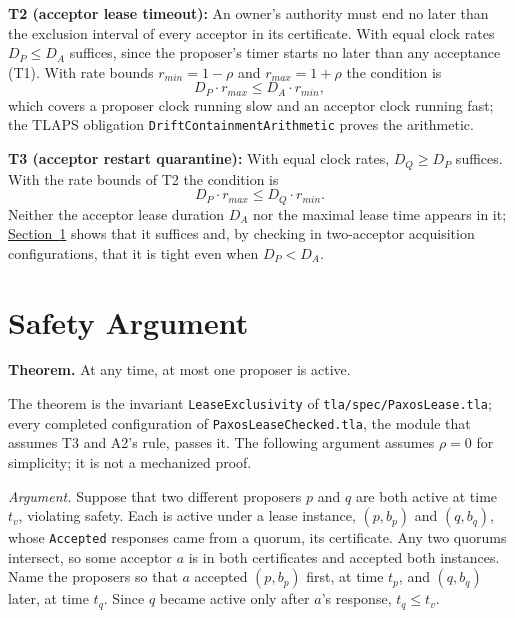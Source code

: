 \documentclass[final,5p,times,twocolumn,number]{elsarticle}
\newcommand{\code}[1]{\texttt{#1}}
\newcommand{\invitem}[1]{\smallskip\noindent\textbf{#1:} }
\newcommand{\secref}[1]{\hyperref[#1]{Section~\ref*{#1}}}
\begin{document}
\invitem{T2 (acceptor lease timeout)}An owner's authority must end no later than the exclusion interval of every acceptor in its certificate.  With equal clock rates $D_P \leq D_A$ suffices, since the proposer's timer starts no later than any acceptance (T1).  With rate bounds $r_{min} = 1-\rho$ and $r_{max} = 1+\rho$ the condition is
\[
  D_P \cdot r_{max} \leq D_A \cdot r_{min},
\]
which covers a proposer clock running slow and an acceptor clock running fast; the TLAPS obligation \code{DriftContainmentArithmetic} proves the arithmetic.

\invitem{T3 (acceptor restart quarantine)}With equal clock rates, $D_Q \geq D_P$ suffices.  With the rate bounds of T2 the condition is
\[
  D_P \cdot r_{max} \leq D_Q \cdot r_{min}.
\]
Neither the acceptor lease duration $D_A$ nor the maximal lease time appears in it; \secref{sec:safety} shows that it suffices and, by checking in two-acceptor acquisition configurations, that it is tight even when $D_P < D_A$.

\section{Safety Argument}\label{sec:safety}

\medskip
\noindent\textbf{Theorem.} At any time, at most one proposer is active.
\medskip

The theorem is the invariant \code{LeaseExclusivity} of \code{tla/spec/PaxosLease.tla}; every completed configuration of \code{PaxosLeaseChecked.tla}, the module that assumes T3 and A2's rule, passes it.  The following argument assumes $\rho = 0$ for simplicity; it is not a mechanized proof.

\emph{Argument.}  Suppose that two different proposers $p$ and $q$ are both active at time $t_v$, violating safety.  Each is active under a lease instance, $(p, b_p)$ and $(q, b_q)$, whose \code{Accepted} responses came from a quorum, its certificate.  Any two quorums intersect, so some acceptor $a$ is in both certificates and accepted both instances.  Name the proposers so that $a$ accepted $(p, b_p)$ first, at time $t_p$, and $(q, b_q)$ later, at time $t_q$.  Since $q$ became active only after $a$'s response, $t_q \leq t_v$.
\end{document}
